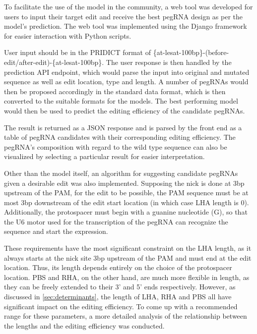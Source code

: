 To facilitate the use of the model in the community, a web tool was developed for users to input their target edit and receive the best pegRNA design as per the model's prediction. The web tool was implemented using the Django framework for easier interaction with Python scripts. 

User input should be in the PRIDICT format of \{at-lesat-100bp\}-(before-edit/after-edit)-\{at-lesat-100bp\}. The user response is then handled by the prediction API endpoint, which would parse the input into original and mutated sequence as well as edit location, type and length. A number of pegRNAs would then be proposed accordingly in the standard data format, which is then converted to the suitable formats for the models. The best performing model would then be used to predict the editing efficiency of the candidate pegRNAs. 


The result is returned as a JSON response and is parsed by the front end as a table of pegRNA candidates with their corresponding editing efficiency. The pegRNA's composition with regard to the wild type sequence can also be visualized by selecting a particular result for easier interpretation.

Other than the model itself, an algorithm for suggesting candidate pegRNAs given a desirable edit was also implemented. Supposing the nick is done at 3bp upstream of the PAM, for the edit to be possible, the PAM sequence must be at most 3bp downstream of the edit start location (in which case LHA length is 0). Additionally, the protospacer must begin with a guanine nucleotide (G), so that the U6 motor used for the transcription of the pegRNA can recognize the sequence and start the expression\cite{hsieh-fengEfficientExpressionMultiple2020}.

These requirements have the most significant constraint on the LHA length, as it always starts at the nick site 3bp upstream of the PAM and must end at the edit location. Thus, its length depends entirely on the choice of the protospacer location. PBS and RHA, on the other hand, are much more flexible in length, as they can be freely extended to their 3' and 5' ends respectively.
However, as discussed in \autoref{sec:determinants}, the length of LHA, RHA and PBS all have significant impact on the editing efficiency. To come up with a recommended range for these parameters, a more detailed analysis of the relationship between the lengths and the editing efficiency was conducted.

